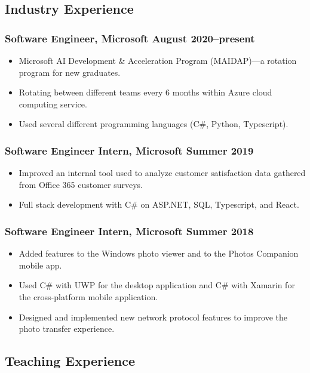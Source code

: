 \documentclass{article}
\begin{document}
	\subsection*{Industry Experience}
		\subsubsection*{Software Engineer, Microsoft \hfill \normalfont \normalsize August 2020--present}
		\begin{itemize}
			\item Microsoft AI Development \& Acceleration Program (MAIDAP)---a rotation program for new graduates.
			\item Rotating between different teams every 6 months within Azure cloud computing service.
			\item Used several different programming languages (C\#, Python, Typescript).
		\end{itemize}
		\subsubsection*{Software Engineer Intern, Microsoft \hfill \normalfont \normalsize Summer 2019}
		\begin{itemize}
			\item Improved an internal tool used to analyze customer satisfaction data gathered from Office 365 customer surveys.
			\item Full stack development with C\# on ASP.NET, SQL, Typescript, and React.
		\end{itemize}
		\subsubsection*{Software Engineer Intern, Microsoft \hfill \normalfont \normalsize Summer 2018}
		\begin{itemize}
			\item Added features to the Windows photo viewer and to the Photos Companion mobile app.
			\item Used C\# with UWP for the desktop application and C\# with Xamarin for the cross-platform mobile application.
			\item Designed and implemented new network protocol features to improve the photo transfer experience.
		\end{itemize}
	
	\subsection*{Teaching Experience}
\end{document}
